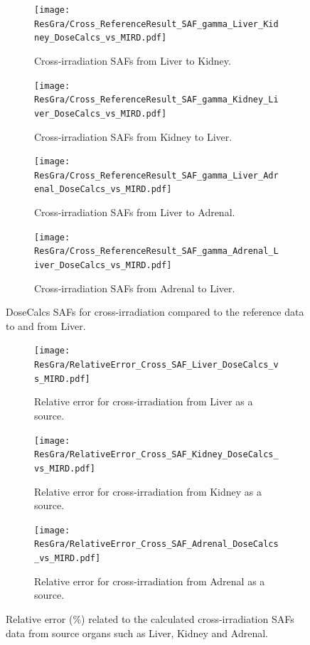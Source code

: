 \documentclass[letterpaper,12pt]{article}
\begin{document}
\begin{figure} [H]
\begin{subfigure}[t]{0.5\textwidth}
  \centering
  \texttt{[image: ResGra/Cross\_ReferenceResult\_SAF\_gamma\_Liver\_Kidney\_DoseCalcs\_vs\_MIRD.pdf]}
	\caption{Cross-irradiation SAFs from Liver to Kidney.}
	\label{fig:CrossCompLiverKidney}
\end{subfigure}\hspace{.03\textwidth}
\begin{subfigure}[t]{0.5\textwidth}
  \centering
  \texttt{[image: ResGra/Cross\_ReferenceResult\_SAF\_gamma\_Kidney\_Liver\_DoseCalcs\_vs\_MIRD.pdf]}
	\caption{Cross-irradiation SAFs from Kidney to Liver.}
	\label{fig:CrossCompKidneyLiver}
\end{subfigure}\vspace{.06\textwidth}
\begin{subfigure}[t]{0.5\textwidth}
  \centering
  \texttt{[image: ResGra/Cross\_ReferenceResult\_SAF\_gamma\_Liver\_Adrenal\_DoseCalcs\_vs\_MIRD.pdf]}
	\caption{Cross-irradiation SAFs from Liver to Adrenal.}
	\label{fig:CrossCompLiverAdrenal}
\end{subfigure}\hspace{.03\textwidth}
\begin{subfigure}[t]{0.5\textwidth}
  \centering
  \texttt{[image: ResGra/Cross\_ReferenceResult\_SAF\_gamma\_Adrenal\_Liver\_DoseCalcs\_vs\_MIRD.pdf]}
	\caption{Cross-irradiation SAFs from Adrenal to Liver.}
	\label{fig:CrossCompAdrenalLiver}
\end{subfigure}
\caption{DoseCalcs SAFs for cross-irradiation compared to the reference data to and from Liver.}
\label{fig:CrossComp}
\end{figure}

\begin{figure} [H]
\begin{subfigure}[t]{0.5\textwidth}
  \centering
  \texttt{[image: ResGra/RelativeError\_Cross\_SAF\_Liver\_DoseCalcs\_vs\_MIRD.pdf]}
	\caption{Relative error for cross-irradiation from Liver as a source.}
	\label{fig:CrossCompErrLiver}
\end{subfigure}\hspace{.03\textwidth}
\begin{subfigure}[t]{0.5\textwidth}
  \centering
  \texttt{[image: ResGra/RelativeError\_Cross\_SAF\_Kidney\_DoseCalcs\_vs\_MIRD.pdf]}
	\caption{Relative error for cross-irradiation from Kidney as a source.}
	\label{fig:CrossCompErrKidney}
\end{subfigure}\vspace{.06\textwidth}
\begin{subfigure}[t]{\textwidth}  
\centering
  \texttt{[image: ResGra/RelativeError\_Cross\_SAF\_Adrenal\_DoseCalcs\_vs\_MIRD.pdf]}
	\caption{Relative error for cross-irradiation from Adrenal as a source.}
	\label{fig:CrossCompErrAdrenal}
\end{subfigure}
\caption{Relative error (\%) related to the calculated cross-irradiation SAFs data from source organs such as Liver, Kidney and Adrenal.}
\label{fig:CrossCompErr}
\end{figure}
\end{document}
